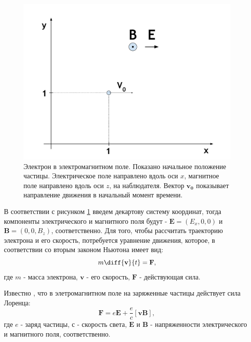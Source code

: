 \documentclass[a4paper]{article}
\begin{document}
\begin{figure}[h]\label{problem}
	\includegraphics[width=\textwidth]{problem.pdf}
	\caption{Электрон в электромагнитном поле. Показано начальное положение частицы. Электрическое поле направлено вдоль оси $x$, магнитное поле направлено вдоль оси $z$, на наблюдателя. Вектор $\mathbf{v_0}$ показывает направление движения в начальный момент времени.}
\end{figure}

В соответствии с рисунком \ref{problem} введем декартову систему координат, тогда компоненты электрического и магнитного поля будут - $\mathbf{E}=(E_x, 0, 0)$ и $\mathbf{B}=(0, 0, B_z)$, соответственно. Для того, чтобы рассчитать траекторию электрона и его скорость, потребуется уравнение движения, которое, в соответствии со вторым законом Ньютона \cite{Sivukhin:mech} имеет вид:
\begin{equation}\label{motion}
m\diff{\mathbf{v}}{t} = \mathbf{F},
\end{equation}
где $m$ - масса электрона, $\mathbf{v}$ - его скорость, $\mathbf{F}$ - действующая сила.

Известно \cite{Landau:field}, что в элетромагнитном поле на заряженные частицы действует сила Лоренца:
\begin{equation}\label{lorenz}
\mathbf{F} = e \mathbf{E} + \frac{e}{c}\left[\mathbf{vB}\right],
\end{equation}
где $e$ - заряд частицы, $с$ - скорость света, $\mathbf{E}$ и $\mathbf{B}$ - напряженности электрического и магнитного поля, соответственно.
\end{document}
